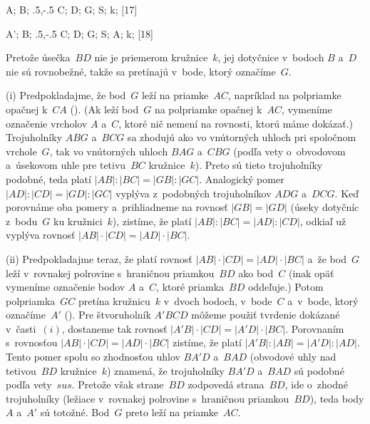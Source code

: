 {%
\fontplace
\rtpoint A; \tpoint B; \tpoint\xy.5,-.5 C; \lBpoint D;
\tpoint{} G; \rpoint S; \lpoint k;
[17] \hfil\Obr

\fontplace
\rtpoint A'; \tpoint B; \tpoint\xy.5,-.5 C; \lBpoint D;
\tpoint{} G; \rpoint S; \rBpoint A; \lpoint k;
[18] \hfil\Obr

Pretože úsečka~$BD$ nie je priemerom kružnice~$k$, jej dotyčnice
v~bodoch $B$ a~$D$ nie sú rovnobežné, takže sa pretínajú v~bode,
ktorý označíme~$G$.

(i) Predpokladajme, že bod~$G$ leží na priamke~$AC$, napríklad na
polpriamke opačnej k~$CA$ (\obr). (Ak leží bod~$G$ na
polpriamke opačnej k~$AC$, vymeníme označenie vrcholov $A$ a~$C$,
ktoré nič nemení na rovnosti, ktorú máme dokázať.) Trojuholníky
$ABG$ a~$BCG$ sa zhodujú ako vo vnútorných uhloch pri spoločnom vrchole~$G$,
tak vo vnútorných uhloch $BAG$ a~$CBG$ (podľa vety
o~obvodovom a~úsekovom uhle pre tetivu~$BC$ kružnice~$k$).
Preto sú tieto trojuholníky podobné, teda platí
$|AB|:|BC|=|GB|:|GC|$. Analogický pomer $|AD|:|CD|=|GD|:|GC|$
vyplýva z~podobných trojuholníkov $ADG$ a~$DCG$. Keď porovnáme oba
pomery a~prihliadneme na rovnosť $|GB|=|GD|$
(úseky dotyčníc z~bodu~$G$ ku kružnici~$k$), zistíme, že platí
$|AB|:|BC|=|AD|:|CD|$, odkiaľ už vyplýva rovnosť
$|AB|\cdot|CD|={|AD|\cdot|BC|}$.
\inspicture{}

(ii) Predpokladajme teraz, že platí rovnosť
$|AB|\cdot|CD|=|AD|\cdot|BC|$ a~že bod~$G$ leží v~rovnakej
polrovine s~hraničnou priamkou~$BD$ ako bod~$C$ (inak opäť
vymeníme označenie bodov $A$ a~$C$, ktoré priamka~$BD$ oddeľuje.)
Potom polpriamka~$GC$ pretína kružnicu~$k$ v~dvoch bodoch, v~bode~$C$
a~v~bode, ktorý označíme~$A'$ (\obr). Pre štvoruholník $A'BCD$
\inspicture{}
môžeme použiť tvrdenie dokázané v~časti~$(i)$, dostaneme tak
rovnosť $|A'B|\cdot|CD|=|A'D|\cdot|BC|$. Porovnaním
s~rovnosťou $|AB|\cdot|CD|=|AD|\cdot|BC|$ zistíme, že platí
$|A'B|:|AB|=|A'D|:|AD|$. Tento pomer spolu so zhodnosťou uhlov
$BA'D$ a~$BAD$ (obvodové uhly nad tetivou~$BD$ kružnice~$k$)
znamená, že trojuholníky $BA'D$ a~$BAD$ sú podobné podľa vety~$sus$.
Pretože však strane~$BD$ zodpovedá strana~$BD$, ide
o~zhodné trojuholníky (ležiace v~rovnakej polrovine s~hraničnou
priamkou~$BD$), teda body $A$ a~$A'$ sú totožné. Bod~$G$ preto leží
na priamke~$AC$.}

